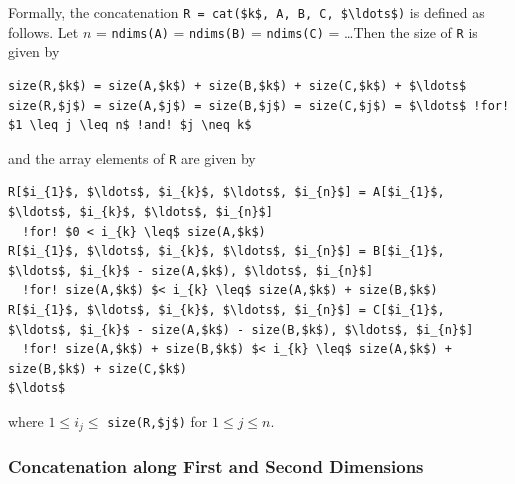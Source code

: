 Formally, the concatenation \lstinline!R = cat($k$, A, B, C, $\ldots$)! is defined as follows.
Let $n$ = \lstinline!ndims(A)! = \lstinline!ndims(B)! = \lstinline!ndims(C)! = \ldots  Then the size of \lstinline!R! is given by
\begin{lstlisting}[language=modelica,escapechar=!,frame=none,xleftmargin=1em]
size(R,$k$) = size(A,$k$) + size(B,$k$) + size(C,$k$) + $\ldots$
size(R,$j$) = size(A,$j$) = size(B,$j$) = size(C,$j$) = $\ldots$ !for! $1 \leq j \leq n$ !and! $j \neq k$
\end{lstlisting}
and the array elements of \lstinline!R! are given by
\begin{lstlisting}[language=modelica,escapechar=!,frame=none,xleftmargin=1em]
R[$i_{1}$, $\ldots$, $i_{k}$, $\ldots$, $i_{n}$] = A[$i_{1}$, $\ldots$, $i_{k}$, $\ldots$, $i_{n}$]
  !for! $0 < i_{k} \leq$ size(A,$k$)
R[$i_{1}$, $\ldots$, $i_{k}$, $\ldots$, $i_{n}$] = B[$i_{1}$, $\ldots$, $i_{k}$ - size(A,$k$), $\ldots$, $i_{n}$]
  !for! size(A,$k$) $< i_{k} \leq$ size(A,$k$) + size(B,$k$)
R[$i_{1}$, $\ldots$, $i_{k}$, $\ldots$, $i_{n}$] = C[$i_{1}$, $\ldots$, $i_{k}$ - size(A,$k$) - size(B,$k$), $\ldots$, $i_{n}$]
  !for! size(A,$k$) + size(B,$k$) $< i_{k} \leq$ size(A,$k$) + size(B,$k$) + size(C,$k$)
$\ldots$
\end{lstlisting}
where $1 \leq i_{j} \leq$ \lstinline!size(R,$j$)! for $1 \leq j \leq n$.


\subsubsection{Concatenation along First and Second Dimensions}\label{array-concatenation-along-first-and-second-dimensions}\label{concatenation-along-first-and-second-dimensions}

